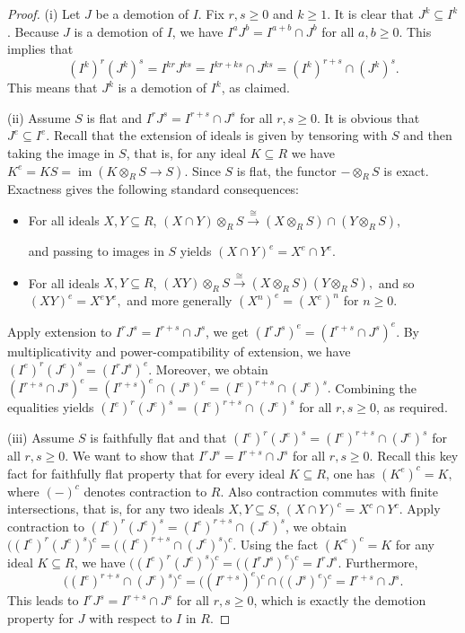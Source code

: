 \documentclass[11pt]{amsart}
\begin{document}
\begin{proof}
(i) Let  $J$ be  a demotion of $I$.  Fix $r,s\geq 0$ and $k\geq 1$. It is clear that $J^k\subseteq I^k$.  Because $J$ is  a demotion of $I$, we have $I^a J^b=I^{a+b} \cap J^b$ for all $a,b\geq 0$. 
 This implies that  $$(I^k)^r (J^k)^s=I^{kr} J^{ks}=I^{kr+ks} \cap J^{ks}= (I^k)^{r+s} \cap (J^k)^s.$$ 
This means that $J^k$ is  a demotion of $I^k$, as claimed. 

(ii)   Assume $S$ is flat and $I^rJ^s = I^{r+s}\cap J^s$ for all $r,s\geq 0$. It is obvious  that $J^e\subseteq I^e$.
Recall that the extension of ideals is given by tensoring with $S$ and then taking the image in $S$, that is, 
for any ideal $K\subseteq R$ we have $K^e=KS=\operatorname{im}(K\otimes_R S\to S)$.
Since $S$ is flat, the functor $-\otimes_R S$ is exact. Exactness gives the following standard consequences:

\begin{itemize}
\item For all ideals $X,Y\subseteq R$, $(X\cap Y)\otimes_R S \xrightarrow{\ \cong\ } (X\otimes_R S)\cap (Y\otimes_R S),$

and passing to images in $S$ yields $(X\cap Y)^e = X^e\cap Y^e.$
\item For all ideals $X,Y\subseteq R$, $(XY)\otimes_R S \xrightarrow{\ \cong\ } (X\otimes_R S)(Y\otimes_R S),$
and so $(XY)^e = X^e Y^e,$ and more generally $(X^n)^e=(X^e)^n$ for $n\geq 0$.
\end{itemize}

Apply extension to $I^rJ^s = I^{r+s}\cap J^s$, we get  $(I^rJ^s)^e = (I^{r+s}\cap J^s)^e.$
By multiplicativity and power-compatibility of extension, we have $(I^e)^r (J^e)^s = (I^rJ^s)^e.$
 Moreover, we obtain $(I^{r+s}\cap J^s)^e = (I^{r+s})^e \cap (J^s)^e = (I^e)^{r+s}\cap (J^e)^s.$
 Combining the equalities yields $(I^e)^r (J^e)^s = (I^e)^{r+s}\cap (J^e)^s$ for all $r,s\geq 0$, as required.
\medskip

(iii) Assume $S$ is faithfully flat and that  $(I^e)^r (J^e)^s = (I^e)^{r+s}\cap (J^e)^s$ for all $r,s\geq 0.$
We want to show that  $I^rJ^s = I^{r+s}\cap J^s$ for all $r,s\geq 0$. Recall this key fact for faithfully flat property that  for every ideal $K\subseteq R$, 
 one has  $(K^e)^c = K,$ where $(-)^c$ denotes contraction to $R$.  Also contraction commutes with finite intersections, that is, for any two  ideals $X,Y\subseteq S$, $(X\cap Y)^c = X^c\cap Y^c$. Apply contraction to $(I^e)^r (J^e)^s = (I^e)^{r+s}\cap (J^e)^s$, we obtain $\big((I^e)^r (J^e)^s\big)^c = \big((I^e)^{r+s}\cap (J^e)^s\big)^c.$
Using   the fact $(K^e)^c = K$ for any ideal $K\subseteq R$, we have 
$\big((I^e)^r (J^e)^s\big)^c = \big((I^rJ^s)^e\big)^c = I^rJ^s.$ Furthermore,   
\[
\big((I^e)^{r+s}\cap (J^e)^s\big)^c
= \big((I^{r+s})^e\big)^c \cap \big((J^s)^e\big)^c
= I^{r+s}\cap J^s.
\]
This leads to $I^rJ^s = I^{r+s}\cap J^s$ for all $r,s\geq 0$, which is exactly the demotion property for $J$ with respect to $I$ in $R$.
\end{proof}
\end{document}
